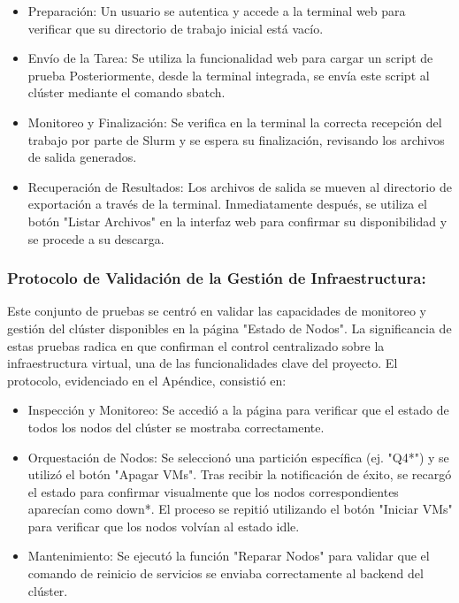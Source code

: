 \begin{itemize}
    \item Preparación: Un usuario se autentica y accede a la terminal web para verificar que su directorio de trabajo inicial está vacío.
    \item Envío de la Tarea: Se utiliza la funcionalidad web para cargar un script de prueba Posteriormente, desde la terminal integrada, se envía este script al clúster mediante el comando sbatch.
    \item Monitoreo y Finalización: Se verifica en la terminal la correcta recepción del trabajo por parte de Slurm y se espera su finalización, revisando los archivos de salida generados.
    \item Recuperación de Resultados: Los archivos de salida se mueven al directorio de exportación a través de la terminal. Inmediatamente después, se utiliza el botón "Listar Archivos" en la interfaz web para confirmar su disponibilidad y se procede a su descarga.
\end{itemize}

\subsubsection{Protocolo de Validación de la Gestión de Infraestructura:}
Este conjunto de pruebas se centró en validar las capacidades de monitoreo y gestión del clúster disponibles en la página "Estado de Nodos". La significancia de estas pruebas radica en que confirman el control centralizado sobre la infraestructura virtual, una de las funcionalidades clave del proyecto. El protocolo, evidenciado en el Apéndice, consistió en:

\begin{itemize}
    \item Inspección y Monitoreo: Se accedió a la página para verificar que el estado de todos los nodos del clúster se mostraba correctamente.
    \item Orquestación de Nodos: Se seleccionó una partición específica (ej. "Q4*") y se utilizó el botón "Apagar VMs". Tras recibir la notificación de éxito, se recargó el estado para confirmar visualmente que los nodos correspondientes aparecían como down*. El proceso se repitió utilizando el botón "Iniciar VMs" para verificar que los nodos volvían al estado idle.
    \item Mantenimiento: Se ejecutó la función "Reparar Nodos" para validar que el comando de reinicio de servicios se enviaba correctamente al backend del clúster.
\end{itemize}

